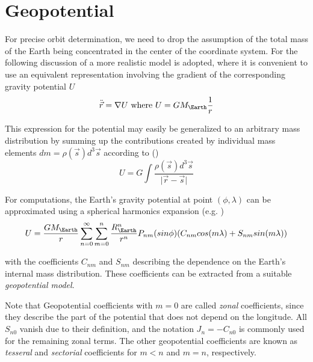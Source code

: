 \section{Geopotential}
For precise orbit determination, we need to drop the assumption of the total mass 
of the Earth being concentrated in the center of the coordinate system. For the
following discussion of a more realistic model is adopted, where it is convenient 
to use an equivalent representation involving the gradient of the corresponding 
gravity potential \(U\)
\begin{equation}
    \ddot{\vec{r}} = \nabla U \textrm{ where } U = G M_{\Earth} \frac{1}{r}
\end{equation}

This expression for the potential may easily be generalized to an arbitrary mass
distribution by summing up the contributions created by individual mass elements
\(dm = \rho(\vec{s}) d^3 \vec{s}\) according to (\cite{Montenbruck2000})
\begin{equation}
    U = G \int{\frac{\rho(\vec{s}) d^3 \vec{s}}{\lvert \vec{r} - \vec{s} \rvert}}
\end{equation}

For computations, the Earth's gravity potential at point \((\phi , \lambda)\) 
can be approximated using a spherical harmonics expansion 
(e.g. \cite{Montenbruck2000})
\begin{equation}
    U = \frac{G M_{\Earth}}{r} \sum_{n=0}^\infty \sum_{m=0}^n 
    \frac{R_{\Earth}^n}{r^n} P_{nm}(sin\phi) 
    (C_{nm} cos(m\lambda) + S_{nm} sin(m\lambda))
\end{equation}

with the coefficients \(C_{nm}\) and \(S_{nm}\) describing the dependence on the 
Earth's internal mass distribution. These coefficients can be extracted from a 
suitable  \emph{geopotential model}.

Note that Geopotential coefficients with \(m=0\) are called  \emph{zonal} coefficients, 
since they describe the part of the potential that does not depend on the longitude. 
All \(S_{n0}\) vanish due to their definition, and the notation \(J_n = -C_{n0}\) 
is commonly used for the remaining zonal terms. The other geopotential coefficients
are known as \emph{tesseral} and \emph{sectorial} coefficients for \(m<n\) and 
\(m = n\), respectively.


